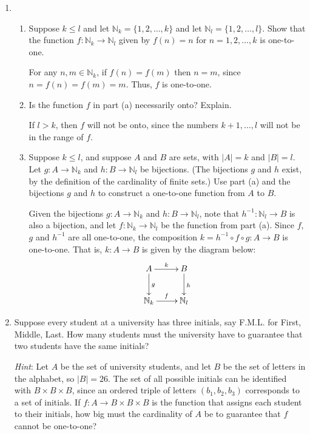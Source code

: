 \documentclass[12pt]{article}
\newcommand{\points}[1]{\marginpar{\hspace{24pt}[#1]}}
\newcommand{\abs}[1]{\lvert #1\rvert}
\newcommand{\N}{\mathbb{N}}
\begin{document}
\thispagestyle{fancy}

 \begin{enumerate}
 \item \begin{enumerate}
        \item Suppose $k\leq l$ and let $\N_k=\{1,2,\ldots, k\}$ and let $\N_l = \{1,2,\ldots, l\}$. Show that the function $f:\N_k\to \N_l$ given by $f(n) = n$ for $n=1,2,\ldots, k$ is one-to-one.\points{2}

\bigskip

For any  $n,m\in \N_k$, if $f(n)=f(m)$ then $n=m$, since $n=f(n)=f(m)=m$. Thus, $f$ is one-to-one.

\bigskip

	\item Is the function $f$ in part (a) necessarily onto? Explain. \points{1}

\bigskip

If $l>k$, then $f$ will not be onto, since the numbers $k+1,\ldots, l$ will not be in the range of $f$.

\bigskip

	\item Suppose $k\leq l$, and suppose $A$ and $B$ are sets, with $\abs{A}=k$ and $\abs{B}=l$. Let $g:A\to \N_k$ and $h:B\to \N_l$ be bijections. (The bijections $g$ and $h$ exist, by the definition of the cardinality of finite sets.) Use part (a) and the bijections $g$ and $h$ to construct a one-to-one function from $A$ to $B$. \points{2}

\bigskip

Given the bijections $g:A\to \N_k$ and $h:B\to \N_l$, note that $h^{-1}:\N_l\to B$ is also a bijection, and let $f:\N_k\to\N_l$ be the function from part (a). Since $f$, $g$ and $h^{-1}$ are all one-to-one, the composition $k=h^{-1}\circ f\circ g:A\to B$ is one-to-one. That is, $k:A\to B$ is given by the diagram below:
\[
 \xymatrix{A \ar[r]^{k} \ar[d]^g& B\ar[d]^h\\ \N_k\ar[r]^f& \N_l}
\]

       \end{enumerate}

\bigskip

\item Suppose every student at a university has three initials, say F.M.L. for First, Middle, Last. How many students must the university have to guarantee that two students have the same initials? \points{5}

{\em Hint}: Let $A$ be the set of university students, and let $B$ be the set of letters in the alphabet, so $\abs{B}=26$. The set of all possible initials can be identified with $B\times B\times B$, since an ordered triple of letters $(b_1,b_2,b_3)$ corresponds to a set of initials. If $f:A\to B\times B\times B$ is the function that assigns each student to their initials, how big must the cardinality of $A$ be to guarantee that $f$ cannot be one-to-one?


\end{enumerate}
\end{document}
